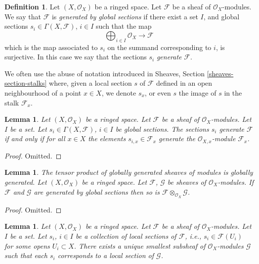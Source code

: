 \documentclass{stacks-project}
\newenvironment{slogan}{\comment}{\endcomment}
\theoremstyle{plain}
\newtheorem{lemma}[subsection]{Lemma}
\theoremstyle{definition}
\newtheorem{definition}[subsection]{Definition}
\theoremstyle{remark}
\numberwithin{equation}{subsection}
\begin{document}
\begin{definition}
\label{definition-globally-generated}
Let $(X, \mathcal{O}_X)$ be a ringed space.
Let $\mathcal{F}$ be a sheaf of $\mathcal{O}_X$-modules.
We say that $\mathcal{F}$ is {\it generated by global
sections} if there exist a set $I$, and
global sections $s_i \in \Gamma(X, \mathcal{F})$, $i \in I$
such that the map
$$
\bigoplus\nolimits_{i \in I}
\mathcal{O}_X \longrightarrow \mathcal{F}
$$
which is the map associated to $s_i$ on the summand corresponding to $i$,
is surjective. In this case we say that the sections $s_i$
{\it generate} $\mathcal{F}$.
\end{definition}

\noindent
We often use the abuse of notation introduced in
Sheaves, Section \ref{sheaves-section-stalks} where, given a local
section $s$ of $\mathcal{F}$ defined in an open neighbourhood
of a point $x \in X$, we denote $s_x$, or even $s$ the image of $s$
in the stalk $\mathcal{F}_x$.

\begin{lemma}
\label{lemma-globally-generated}
Let $(X, \mathcal{O}_X)$ be a ringed space.
Let $\mathcal{F}$ be a sheaf of $\mathcal{O}_X$-modules.
Let $I$ be a set. Let
$s_i \in \Gamma(X, \mathcal{F})$, $i \in I$
be global sections. The sections $s_i$ generate
$\mathcal{F}$ if and only if for all $x\in X$ the
elements $s_{i, x} \in \mathcal{F}_x$ generate
the $\mathcal{O}_{X, x}$-module $\mathcal{F}_x$.
\end{lemma}

\begin{proof}
Omitted.
\end{proof}

\begin{lemma}
\label{lemma-tensor-product-globally-generated}
\begin{slogan}
The tensor product of globally generated sheaves of modules is
globally generated.
\end{slogan}
Let $(X, \mathcal{O}_X)$ be a ringed space.
Let $\mathcal{F}$, $\mathcal{G}$ be sheaves of $\mathcal{O}_X$-modules.
If $\mathcal{F}$ and $\mathcal{G}$ are generated by global sections
then so is $\mathcal{F} \otimes_{\mathcal{O}_X} \mathcal{G}$.
\end{lemma}

\begin{proof}
Omitted.
\end{proof}

\begin{lemma}
\label{lemma-generated-by-local-sections}
Let $(X, \mathcal{O}_X)$ be a ringed space.
Let $\mathcal{F}$ be a sheaf of $\mathcal{O}_X$-modules.
Let $I$ be a set. Let $s_i$, $i \in I$ be a collection
of local sections of $\mathcal{F}$, i.e., $s_i \in \mathcal{F}(U_i)$
for some opens $U_i \subset X$. There exists a unique smallest
subsheaf of $\mathcal{O}_X$-modules $\mathcal{G}$ such
that each $s_i$ corresponds to a local section of
$\mathcal{G}$.
\end{lemma}
\end{document}
